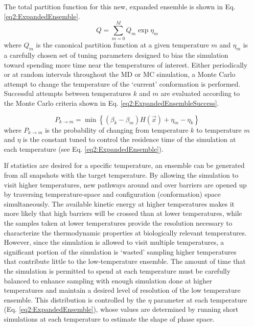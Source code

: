 The total partition function for this new, expanded ensemble is shown in Eq.
\ref{eq2:ExpandedEnsemble}. \cite{Lyubartsev_JChemPhys_1992_v96_p1776}
\begin{equation}
   Q = \sum _ {m=0} ^ M Q_m \exp{\eta_m}
   \label{eq2:ExpandedEnsemble}
\end{equation}
where $Q_m$ is the canonical partition function at a given temperature $m$ and
$\eta_m$ is a carefully chosen set of tuning parameters designed to bias the
simulation toward spending more time near the temperatures of interest.
\cite{Lyubartsev_JChemPhys_1992_v96_p1776} Either periodically or at random
intervals throughout the MD or MC simulation, a Monte Carlo attempt to change
the temperature of the `current' conformation is performed. Successful attempts
between temperatures $k$ and $m$ are evaluated according to the Monte Carlo
criteria shown in Eq. \ref{eq2:ExpandedEnsembleSuccess}.

\begin{equation}
   P_{k \rightarrow m} = \min \left \lbrace \left( \beta _ k - \beta _ m \right)
         H(\vec{x}) + \eta _ m - \eta _ k \right \rbrace
   \label{eq2:ExpandedEnsembleSuccess}
\end{equation}
where $P_{k \rightarrow m}$ is the probability of changing from temperature $k$
to temperature $m$ and $\eta$ is the constant tuned to control the residence
time of the simulation at each temperature (see Eq. \ref{eq2:ExpandedEnsemble}).

If statistics are desired for a specific temperature, an ensemble can be
generated from all snapshots with the target temperature. By allowing the
simulation to visit higher temperatures, new pathways around and over barriers
are opened up by traversing temperature-space and configuration (conformation)
space simultaneously. The available kinetic energy at higher temperatures makes
it more likely that high barriers will be crossed than at lower temperatures,
while the samples taken at lower temperatures provide the resolution necessary
to characterize the thermodynamic properties at biologically relevant
temperatures. However, since the simulation is allowed to visit multiple
temperatures, a significant portion of the simulation is `wasted' sampling
higher temperatures that contribute little to the low-temperature ensemble. The
amount of time that the simulation is permitted to spend at each temperature
must be carefully balanced to enhance sampling with enough simulation done at
higher temperatures and maintain a desired level of resolution of the low
temperature ensemble. This distribution is controlled by the $\eta$ parameter at
each temperature (Eq. \ref{eq2:ExpandedEnsemble}), whose values are determined
by running short simulations at each temperature to estimate the shape of phase
space. \cite{Lyubartsev_JChemPhys_1992_v96_p1776}

